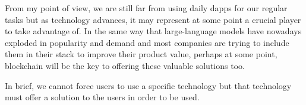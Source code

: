 \documentclass[a4paper,12pt]{article}
\begin{document}
{From my point of view, we are still far from using daily dapps for our regular tasks but as technology advances, it may represent at some point a crucial player to take advantage of. In the same way that large-language models have nowadays exploded in popularity and demand and most companies are trying to include them in their stack to improve their product value, perhaps at some point, blockchain will be the key to offering these valuable solutions too. 

In brief, we cannot force users to use a specific technology but that technology must offer a solution to the users in order to be used.

}

\clearpage
\printglossary

\newpage

\medskip



\clearpage
\newpage
\end{document}

